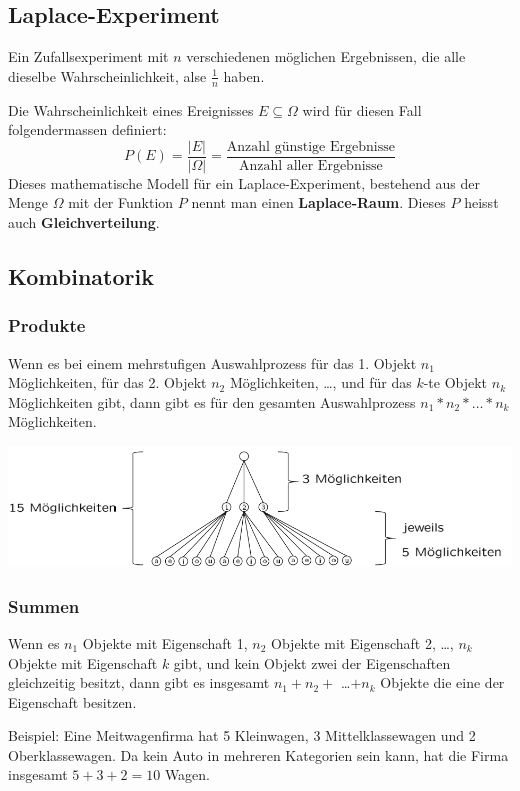 \documentclass[10pt]{article}
\newtheorem[M]{definition}{Def.}
\newtheorem[M]{satz}{Satz}
\numberwithin{equation}{section}
\begin{document}
\subsection{Laplace-Experiment}
\begin{definition}
Ein Zufallsexperiment mit $n$ verschiedenen möglichen Ergebnissen, die alle dieselbe Wahrscheinlichkeit, alse $\frac{1}{n}$ haben.
\end{definition}

Die Wahrscheinlichkeit eines Ereignisses $E \subseteq\Omega$ wird für diesen Fall folgendermassen definiert:
\begin{equation}
  P(E)=\frac{|E|}{|\Omega|}=\frac{\text{Anzahl günstige Ergebnisse}}{\text{Anzahl aller Ergebnisse}}
\end{equation}
Dieses mathematische Modell für ein Laplace-Experiment, bestehend aus der Menge $\Omega$ mit der Funktion $P$ nennt man einen \textbf{Laplace-Raum}. Dieses $P$ heisst auch \textbf{Gleichverteilung}.

\subsection{Kombinatorik}

\subsubsection{Produkte}
\begin{definition}[Produktregel]
Wenn es bei einem mehrstufigen Auswahlprozess für das 1. Objekt $n_1$ Möglichkeiten, für das 2. Objekt $n_2$ Möglichkeiten, \dots , und für das $k$-te Objekt $n_k$ Möglichkeiten gibt, dann gibt es für den gesamten Auswahlprozess $n_1*n_2* \dots * n_k$ Möglichkeiten.
\end{definition}
\begin{center}
	\includegraphics[scale=0.4]{produktregel.png}
\end{center}

\subsubsection{Summen}
\begin{definition}[Summenregel]
Wenn es $n_1$ Objekte mit Eigenschaft 1, $n_2$ Objekte mit Eigenschaft 2, \dots, $n_k$ Objekte mit Eigenschaft $k$ gibt, und kein Objekt zwei der Eigenschaften gleichzeitig besitzt, dann gibt es insgesamt $n_1+n_2+$ \dots $+n_k$ Objekte die eine der Eigenschaft besitzen.
\end{definition}
Beispiel: Eine Meitwagenfirma hat 5 Kleinwagen, 3 Mittelklassewagen und 2 Oberklassewagen. Da kein Auto in mehreren Kategorien sein kann, hat die Firma insgesamt $5+3+2=10$ Wagen.
\end{document}
